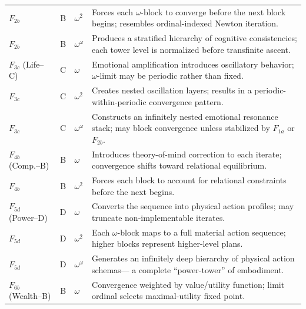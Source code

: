\begin{longtable}{p{2.2cm}|c|p{1.5cm}|p{5.5cm}}
$F_{2b}$ & B & $\omega^2$
& Forces each $\omega$-block to converge before the next block begins;
  resembles ordinal-indexed Newton iteration. \\

$F_{2b}$ & B & $\omega^\omega$
& Produces a stratified hierarchy of cognitive consistencies;
  each tower level is normalized before transfinite ascent. \\

\midrule

$F_{3c}$ (Life--C) & C & $\omega$
& Emotional amplification introduces oscillatory behavior;
  $\omega$-limit may be periodic rather than fixed. \\

$F_{3c}$ & C & $\omega^2$
& Creates nested oscillation layers;
  results in a periodic-within-periodic convergence pattern. \\

$F_{3c}$ & C & $\omega^\omega$
& Constructs an infinitely nested emotional resonance stack;
  may block convergence unless stabilized by $F_{1a}$ or $F_{2b}$. \\

\midrule

$F_{4b}$ (Comp.--B) & B & $\omega$
& Introduces theory-of-mind correction to each iterate;
  convergence shifts toward relational equilibrium. \\

$F_{4b}$ & B & $\omega^2$
& Forces each block to account for relational constraints before the next begins. \\

\midrule

$F_{5d}$ (Power--D) & D & $\omega$
& Converts the sequence into physical action profiles;
  may truncate non-implementable iterates. \\

$F_{5d}$ & D & $\omega^2$
& Each $\omega$-block maps to a full material action sequence;
  higher blocks represent higher-level plans. \\

$F_{5d}$ & D & $\omega^\omega$
& Generates an infinitely deep hierarchy of physical action schemas---
  a complete ``power-tower'' of embodiment. \\

\midrule

$F_{6b}$ (Wealth--B) & B & $\omega$
& Convergence weighted by value/utility function;
  limit ordinal selects maximal-utility fixed point. \\


\end{longtable}
